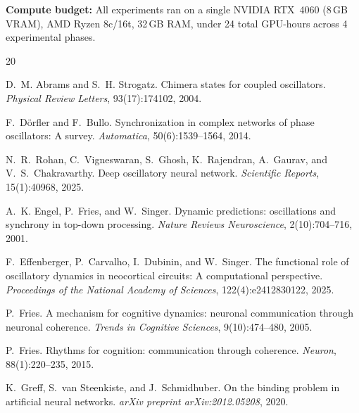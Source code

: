 \documentclass[11pt]{article}
\begin{document}
\textbf{Compute budget:} All experiments ran on a single NVIDIA
RTX~4060 (8\,GB VRAM), AMD Ryzen 8c/16t, 32\,GB RAM, under 24 total
GPU-hours across 4 experimental phases.



\begin{thebibliography}{20}

D.~M. Abrams and S.~H. Strogatz.
\newblock Chimera states for coupled oscillators.
\newblock \emph{Physical Review Letters}, 93(17):174102, 2004.

F.~D\"orfler and F.~Bullo.
\newblock Synchronization in complex networks of phase oscillators: A survey.
\newblock \emph{Automatica}, 50(6):1539--1564, 2014.

N.~R.~Rohan, C.~Vigneswaran, S.~Ghosh, K.~Rajendran, A.~Gaurav,
  and V.~S.~Chakravarthy.
\newblock Deep oscillatory neural network.
\newblock \emph{Scientific Reports}, 15(1):40968, 2025.

A.~K. Engel, P.~Fries, and W.~Singer.
\newblock Dynamic predictions: oscillations and synchrony in top-down
  processing.
\newblock \emph{Nature Reviews Neuroscience}, 2(10):704--716, 2001.

F.~Effenberger, P.~Carvalho, I.~Dubinin, and W.~Singer.
\newblock The functional role of oscillatory dynamics in neocortical
  circuits: A computational perspective.
\newblock \emph{Proceedings of the National Academy of Sciences},
  122(4):e2412830122, 2025.

P.~Fries.
\newblock A mechanism for cognitive dynamics: neuronal communication through
  neuronal coherence.
\newblock \emph{Trends in Cognitive Sciences}, 9(10):474--480, 2005.

P.~Fries.
\newblock Rhythms for cognition: communication through coherence.
\newblock \emph{Neuron}, 88(1):220--235, 2015.

K.~Greff, S.~van Steenkiste, and J.~Schmidhuber.
\newblock On the binding problem in artificial neural networks.
\newblock \emph{arXiv preprint arXiv:2012.05208}, 2020.


\end{thebibliography}
\end{document}
